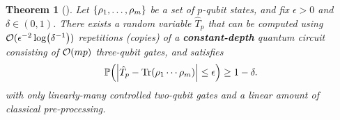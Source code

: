 \documentclass[
aps,
pra,
floatfix,
]{revtex4-2}
\theoremstyle{plain}
\newtheorem{theorem}{Theorem}
\theoremstyle{definition}
\newtheorem{definition}{Definition}
\newcommand{\hamiltonian}{\hat{H}}
\newcommand{\dm}{\rho}
\begin{document}

\begin{theorem}[\cite{quekMultivariateTraceEstimation2022}]\label{thm:multivariate_trace}
	Let $\qty{\dm_1,\dots,\dm_m}$ be a set of $p$-qubit states, and fix $\epsilon > 0$ and $\delta \in (0,1)$.
	There exists a random variable $\hat{T}_p$ that can be computed using $\mathcal{O}(\epsilon^{-2}\log( \delta^{-1}))$ repetitions (copies) of a \textbf{constant-depth} quantum circuit consisting of $\mathcal{O}(mp)$ three-qubit gates, and satisfies 
	\begin{equation}
		\probability\qty(\abs{\hat{T}_p - \Tr(\dm_1\cdots\dm_m)}\le \epsilon) \ge 1 -\delta.
	\end{equation}
	with only linearly-many controlled two-qubit gates 
	and a linear amount of classical pre-processing.
\end{theorem}
\end{document}
